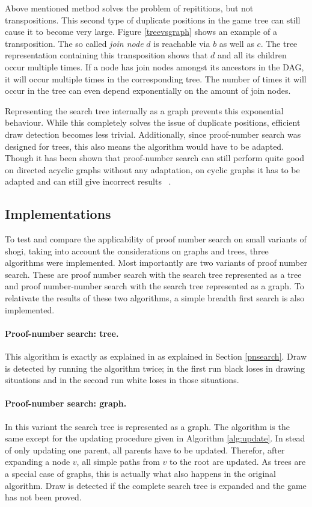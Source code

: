 \documentclass{article}
\begin{document}
Above mentioned method solves the problem of repititions, but not transpositions. This second type of duplicate positions in the game tree
can still cause it to become very large. Figure \ref{treevsgraph} shows an example of a transposition. The so called \emph{join node} $d$ is
reachable via $b$ as well as $c$. The tree representation containing this transposition shows that $d$ and all its children occur multiple times.
If a node has join nodes amongst its ancestors in the DAG, it will
occur multiple times in the corresponding tree. The number of times it will occur in the tree can even depend exponentially on the amount of join
nodes.

Representing the search tree internally as a graph prevents this exponential behaviour. While this completely solves the issue of duplicate
positions, efficient draw detection becomes less trivial. Additionally, since proof-number search was designed for trees, this also means
the algorithm would have to be adapted.
Though it has been shown that proof-number search can still perform quite good on directed acyclic graphs without any adaptation,
on cyclic graphs it has to be adapted and can still give incorrect results ~\cite{Schijf93}.\\

\subsection{Implementations}
To test and compare the applicability of proof number search on small variants of shogi, taking into account the considerations on graphs and trees,
three algorithms were implemented. Most importantly are two variants of proof number search. These are proof number search with the search tree
represented as a tree and proof number-number search with the search tree represented as a graph.
To relativate the results of these two algorithms, a simple breadth first search is also implemented.

\paragraph{Proof-number search: tree.} This algorithm is exactly as explained in  as explained in Section \ref{pnsearch}. Draw is detected by running
the algorithm twice; in the first run black loses in drawing situations and in the second run white loses in those situations.

\paragraph{Proof-number search: graph.} In this variant the search tree is represented as a graph. The algorithm is the same except for the updating
procedure given in Algorithm \ref{alg:update}. In stead of only updating one parent, all parents have to be updated. Therefor, after expanding a
node $v$, all simple paths from $v$ to the root are updated. As trees are a special case of graphs, this is actually what also happens in the original
algorithm. Draw is detected if the complete search tree is expanded and the game has not been proved.
\end{document}
